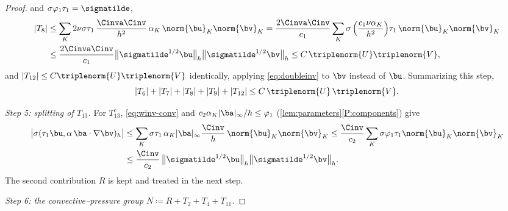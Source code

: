 \begin{proof}
and $\sigma\varphi_1\tau_1=\sigmatilde$,
\begin{align}
  |T_8|
  &\le \sum_{K} 2\nu\sigma\tau_1\,\frac{\Cinva\Cinv}{h^2}\,\alpha_K\,
  \norm{\bu}_K\norm{\bv}_K
  = \frac{2\Cinva\Cinv}{c_1}\sum_{K}
  \sigma\,\Bigl(\frac{c_1\nu\alpha_K}{h^2}\Bigr)\tau_1\,\norm{\bu}_K\norm{\bv}_K
  \nonumber\\
  &\le \frac{2\Cinva\Cinv}{c_1}
  \bigl\lVert\sigmatilde^{1/2}\bu\bigr\rVert_h
  \bigl\lVert\sigmatilde^{1/2}\bv\bigr\rVert_h
  \le C\,\triplenorm{U}\triplenorm{V},
  \label{eq:T8bound}
\end{align}
and $|T_{12}|\le C\triplenorm{U}\triplenorm{V}$ identically, applying
\eqref{eq:doubleinv} to $\bv$ instead of $\bu$. Summarizing this step,
\begin{equation}\label{eq:viscstep}
  |T_6|+|T_7|+|T_8|+|T_9|+|T_{12}| \le C\,\triplenorm{U}\,\triplenorm{V}.
\end{equation}

\medskip\noindent\emph{Step 5: splitting of $T_{13}$.}
 For $T_{13}^{\mathrm{c}}$,
\eqref{eq:winv-conv} and $c_2\alpha_K|\ba|_\infty/h\le\varphi_1$
(\cref{lem:parameters}\ref{P:components}) give
\begin{align}
  \bigl|\sigma(\tau_1\bu,\alpha\,\ba\cdot\nabla\bv)_h\bigr|
  &\le \sum_K \sigma\tau_1\,\alpha_K|\ba|_{\infty}\frac{\Cinv}{h}\,
  \norm{\bu}_K\norm{\bv}_K
  \le \frac{\Cinv}{c_2}\sum_K \sigma\varphi_1\tau_1\norm{\bu}_K\norm{\bv}_K
  \nonumber\\
  &\le \frac{\Cinv}{c_2}\,
  \bigl\lVert\sigmatilde^{1/2}\bu\bigr\rVert_h
  \bigl\lVert\sigmatilde^{1/2}\bv\bigr\rVert_h .
  \label{eq:T13conv}
\end{align}
The second contribution $R$ is kept and treated in the next step.

\medskip\noindent\emph{Step 6: the convective--pressure group
$N\coloneqq R+T_2+T_4+T_{11}$.}


\end{proof}
